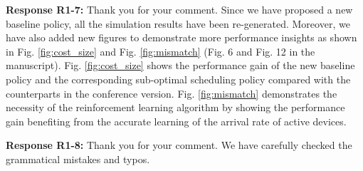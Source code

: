 \documentclass[12pt,onecolumn]{IEEEtran}
\newcommand{\blue}{\color{blue}}
\newcommand{\spaceblank}{\vskip 4mm}
\begin{document}
\spaceblank
{}
\spaceblank
{\blue \textbf{Response R1-7:} Thank you for your comment. Since we have proposed a new baseline policy, all the simulation results have been re-generated. Moreover, we have also added new figures to demonstrate more performance insights as shown in Fig. \ref{fig:cost_size} and Fig. \ref{fig:mismatch} (Fig. 6 and Fig. 12 in the manuscript). Fig. \ref{fig:cost_size} shows the performance gain of the new baseline policy and the corresponding sub-optimal scheduling policy compared with the counterparts in the conference version. Fig. \ref{fig:mismatch} demonstrates the necessity of the reinforcement learning algorithm by showing the performance gain benefiting from the accurate learning of the arrival rate of active devices.
}


\spaceblank
{}
\spaceblank
{\blue \textbf{Response R1-8:} Thank you for your comment. We have carefully checked the grammatical mistakes and typos.
}
\end{document}
